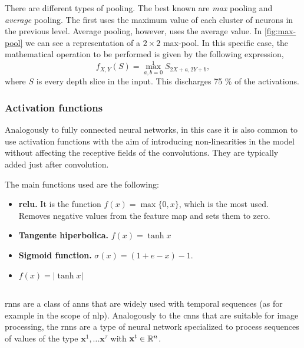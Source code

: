 There are different types of pooling. The best known are \emph{max} pooling and
\emph{average} pooling. The first uses the maximum value of each cluster of
neurons in the previous level. Average pooling, however, uses the average
value. In \vref{fig:max-pool} we can see a representation of a \(2 \times 2\)
max-pool. In this specific case, the mathematical operation to be performed is
given by the following expression,
\begin{equation}
  f_{X,Y}(S) = \max _{a,b=0}^{1}S_{2X+a,2Y+b},
\end{equation}
where \(S\) is every depth slice in the input. This discharges 75 \% of the
activations.

\subsubsection{Activation functions}

Analogously to fully connected neural networks, in this case it is also common
to use activation functions with the aim of introducing non-linearities in the
model without affecting the receptive fields of the convolutions. They are
typically added just after convolution.

The main functions used are the following:
\begin{itemize}
  \item \textbf{\gls{relu}.} It is the function \(f (x) = \max \{0, x\}\),
  which is the most used. Removes negative values from the feature map and sets
  them to zero.
  \item \textbf{Tangente hiperbolica.} \(f (x) = \tanh x\)
  \item \textbf{Sigmoid function.} \(\sigma (x) ={(1 + e - x)} -1\).
  \item \(f (x) = | \tanh x |\)
\end{itemize}


\subsection{}\label{sec:rnn}

\glspl{rnn} are a class of \glspl{ann} that are widely used with temporal
sequences (as for example in the scope of \gls{nlp}). Analogously to the
\glspl{cnn} that are suitable for image processing, the \glspl{rnn} are a type
of neural network specialized to process sequences of values of the type
\(\mathbf{x}^1, \ldots \mathbf{x}^{\tau}\) with \(\mathbf{x}^t \in \mathbb{R}^n\).

